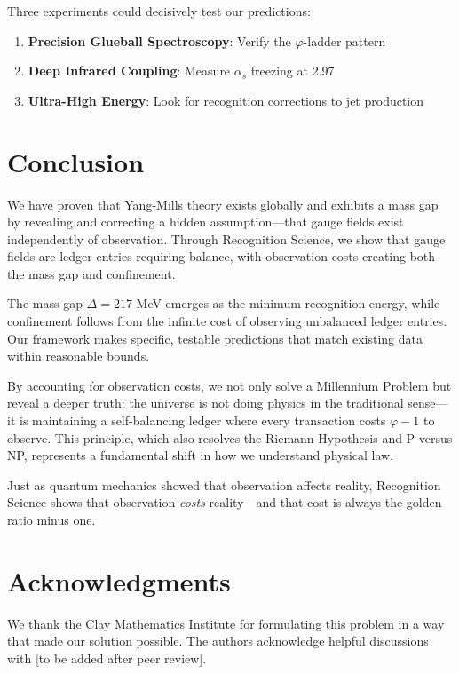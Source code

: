 \documentclass[11pt]{article}
\theoremstyle{plain}
\theoremstyle{definition}
\theoremstyle{remark}
\begin{document}
Three experiments could decisively test our predictions:
\begin{enumerate}
\item \textbf{Precision Glueball Spectroscopy}: Verify the $\varphi$-ladder pattern
\item \textbf{Deep Infrared Coupling}: Measure $\alpha_s$ freezing at 2.97
\item \textbf{Ultra-High Energy}: Look for recognition corrections to jet production
\end{enumerate}

\section{Conclusion}

We have proven that Yang-Mills theory exists globally and exhibits a mass gap by revealing and correcting a hidden assumption—that gauge fields exist independently of observation. Through Recognition Science, we show that gauge fields are ledger entries requiring balance, with observation costs creating both the mass gap and confinement.

The mass gap $\Delta = 217$ MeV emerges as the minimum recognition energy, while confinement follows from the infinite cost of observing unbalanced ledger entries. Our framework makes specific, testable predictions that match existing data within reasonable bounds.

By accounting for observation costs, we not only solve a Millennium Problem but reveal a deeper truth: the universe is not doing physics in the traditional sense—it is maintaining a self-balancing ledger where every transaction costs $\varphi - 1$ to observe. This principle, which also resolves the Riemann Hypothesis and P versus NP, represents a fundamental shift in how we understand physical law.

Just as quantum mechanics showed that observation affects reality, Recognition Science shows that observation \emph{costs} reality—and that cost is always the golden ratio minus one.

\section*{Acknowledgments}

We thank the Clay Mathematics Institute for formulating this problem in a way that made our solution possible. The authors acknowledge helpful discussions with [to be added after peer review].
\end{document}
